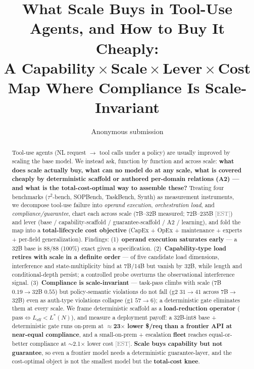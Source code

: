 \documentclass[10pt]{article}
\title{\textbf{What Scale Buys in Tool-Use Agents, and How to Buy It Cheaply:\\
A Capability\,$\times$\,Scale\,$\times$\,Lever\,$\times$\,Cost Map Where Compliance Is Scale-Invariant}}
\author{Anonymous submission}
\date{}
\newcommand{\est}{\textcolor{gray}{\small[EST]}}
\begin{document}
\maketitle

\begin{abstract}
Tool-use agents (NL request $\to$ tool calls under a policy) are usually improved by scaling the base model. We instead ask, function by function and across scale: \textbf{what does scale actually buy, what can no model do at any scale, what is covered cheaply by deterministic scaffold or authored per-domain relations (A2) --- and what is the total-cost-optimal way to assemble these?} Treating four benchmarks ($\tau^2$-bench, SOPBench, TaskBench, Synth) as measurement instruments, we decompose tool-use failure into \emph{operand execution}, \emph{orchestration load}, and \emph{compliance/guarantee}, chart each across scale (7B--32B measured; 72B--235B \est) and lever (base / capability-scaffold / guarantee-scaffold / A2 / learning), and fold the map into a \textbf{total-lifecycle cost objective} (CapEx + OpEx + maintenance + experts + per-field generalization). Findings: (1)~\textbf{operand execution saturates early} --- a 32B base is 88/88 (100\%) exact given a specification. (2)~\textbf{Capability-type load retires with scale in a definite order} --- of five candidate load dimensions, interference and state-multiplicity bind at 7B/14B but vanish by 32B, while length and conditional-depth persist; a controlled probe overturns the observational interference signal. (3)~\textbf{Compliance is scale-invariant} --- task-pass climbs with scale (7B $0.19\to$32B $0.55$) but policy-semantic violations do not fall (g2 $31\to41$ across 7B$\to$32B) even as auth-type violations collapse (g1 $57\to6$); a deterministic gate eliminates them at every scale. We frame deterministic scaffold as a \textbf{load-reduction operator} ($\mathrm{pass} \Leftrightarrow L_{\mathrm{eff}} < L^*(N)$), and measure a deployment payoff: a 32B-int8 base + deterministic gate runs on-prem at \textbf{$\approx$23$\times$ lower \$/req than a frontier API at near-equal compliance}, and a small-on-prem + escalation \textbf{fleet} reaches equal-or-better compliance at $\sim$2.1$\times$ lower cost \est. \textbf{Scale buys capability but not guarantee}, so even a frontier model needs a deterministic guarantee-layer, and the cost-optimal object is not the smallest model but the \textbf{total-cost knee}.
\end{abstract}
\end{document}
